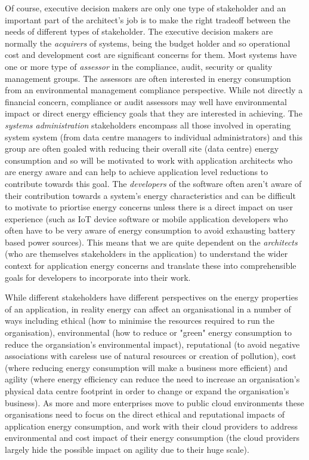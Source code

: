 Of course, executive decision makers are only one type of stakeholder and an important part of the architect's job is to make the right tradeoff between the needs of different types of stakeholder.  The executive decision makers are normally the \emph{acquirers} of systems, being the budget holder and so operational cost and development cost are significant concerns for them.  Most systems have one or more type of \emph{assessor} in the compliance, audit, security or quality management groups.  The assessors are often interested in energy consumption from an environmental management compliance perspective.  While not directly a financial concern, compliance or audit assessors may well have environmental impact or direct energy efficiency goals that they are interested in achieving.  The \emph{systems administration} stakeholders encompass all those involved in operating system system (from data centre managers to individual administrators) and this group are often goaled with reducing their overall site (data centre) energy consumption and so will be motivated to work with application architects who are energy aware and can help to achieve application level reductions to contribute towards this goal.  The \emph{developers} of the software often aren't aware of their contribution towards a system's energy characteristics and can be difficult to motivate to priortise energy concerns unless there is a direct impact on user experience (such as IoT device software or mobile application developers who often have to be very aware of energy consumption to avoid exhausting battery based power sources).  This means that we are quite dependent on the \emph{architects} (who are themselves stakeholders in the application) to understand the wider context for application energy concerns and translate these into comprehensible goals for developers to incorporate into their work.

While different stakeholders have different perspectives on the energy properties of an application, in reality energy can affect an organisational in a number of ways including ethical (how to minimise the resources required to run the organisation), environmental (how to reduce or "green" energy consumption to reduce the organsiation's environmental impact), reputational (to avoid negative associations with careless use of natural resources or creation of pollution), cost (where reducing energy consumption will make a business more efficient) and agility (where energy efficiency can reduce the need to increase an organisation's physical data centre footprint in order to change or expand the organisation's business).  As more and more enterprises move to public cloud environments \cite{idc2016-cloudreport} these organisations need to focus on the direct ethical and reputational impacts of application energy consumption, and work with their cloud providers to address environmental and cost impact of their energy consumption (the cloud providers largely hide the possible impact on agility due to their huge scale). 

